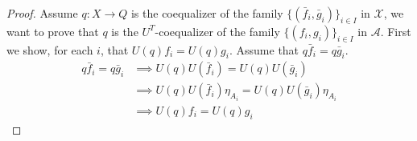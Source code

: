 \begin{subbox}{}
\begin{proof}
    Assume $q:X \to Q$ is the coequalizer of the family $\{(\bar{f}_i,\bar{g}_i)\}_{i\in I}$ in $\mathcal{X}$, we want to prove that $q$ is the $U^T$-coequalizer of the family $\{(f_i,g_i)\}_{i\in I}$ in $\mathcal{A}$. First we show, for each $i$, that $U(q)f_i=U(q)g_i$. Assume that $q\bar{f}_i=q\bar{g}_i$.
    \begin{align*}
        q\bar{f}_i=q\bar{g}_i &\implies U(q) U(\bar{f}_i) = U(q) U(\bar{g}_i) \\[1.5ex]
        &\implies U(q) U(\bar{f}_i) \eta_{A_i}= U(q) U(\bar{g}_i) \eta_{A_i} \\[1.5ex]
        &\implies U(q)f_i=U(q)g_i
    \end{align*}


\end{proof}
\end{subbox}
